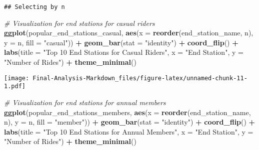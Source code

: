 \documentclass[
]{article}
\newenvironment{Shaded}{\begin{snugshade}}{\end{snugshade}}
\newcommand{\AttributeTok}[1]{\textcolor[rgb]{0.13,0.29,0.53}{#1}}
\newcommand{\CommentTok}[1]{\textcolor[rgb]{0.56,0.35,0.01}{\textit{#1}}}
\newcommand{\FunctionTok}[1]{\textcolor[rgb]{0.13,0.29,0.53}{\textbf{#1}}}
\newcommand{\NormalTok}[1]{#1}
\newcommand{\SpecialCharTok}[1]{\textcolor[rgb]{0.81,0.36,0.00}{\textbf{#1}}}
\newcommand{\StringTok}[1]{\textcolor[rgb]{0.31,0.60,0.02}{#1}}
\begin{document}
\begin{verbatim}
## Selecting by n
\end{verbatim}

\begin{Shaded}
\begin{Highlighting}[]
\CommentTok{\# Visualization for end stations for casual riders}
\FunctionTok{ggplot}\NormalTok{(popular\_end\_stations\_casual, }\FunctionTok{aes}\NormalTok{(}\AttributeTok{x =} \FunctionTok{reorder}\NormalTok{(end\_station\_name, n), }\AttributeTok{y =}\NormalTok{ n, }\AttributeTok{fill =} \StringTok{"casual"}\NormalTok{)) }\SpecialCharTok{+}
  \FunctionTok{geom\_bar}\NormalTok{(}\AttributeTok{stat =} \StringTok{"identity"}\NormalTok{) }\SpecialCharTok{+}
  \FunctionTok{coord\_flip}\NormalTok{() }\SpecialCharTok{+}
  \FunctionTok{labs}\NormalTok{(}\AttributeTok{title =} \StringTok{"Top 10 End Stations for Casual Riders"}\NormalTok{, }\AttributeTok{x =} \StringTok{"End Station"}\NormalTok{, }\AttributeTok{y =} \StringTok{"Number of Rides"}\NormalTok{) }\SpecialCharTok{+}
  \FunctionTok{theme\_minimal}\NormalTok{()}
\end{Highlighting}
\end{Shaded}

\texttt{[image: Final-Analysis-Markdown\_files/figure-latex/unnamed-chunk-11-1.pdf]}

\begin{Shaded}
\begin{Highlighting}[]
\CommentTok{\# Visualization for end stations for annual members}
\FunctionTok{ggplot}\NormalTok{(popular\_end\_stations\_members, }\FunctionTok{aes}\NormalTok{(}\AttributeTok{x =} \FunctionTok{reorder}\NormalTok{(end\_station\_name, n), }\AttributeTok{y =}\NormalTok{ n, }\AttributeTok{fill =} \StringTok{"member"}\NormalTok{)) }\SpecialCharTok{+}
  \FunctionTok{geom\_bar}\NormalTok{(}\AttributeTok{stat =} \StringTok{"identity"}\NormalTok{) }\SpecialCharTok{+}
  \FunctionTok{coord\_flip}\NormalTok{() }\SpecialCharTok{+}
  \FunctionTok{labs}\NormalTok{(}\AttributeTok{title =} \StringTok{"Top 10 End Stations for Annual Members"}\NormalTok{, }\AttributeTok{x =} \StringTok{"End Station"}\NormalTok{, }\AttributeTok{y =} \StringTok{"Number of Rides"}\NormalTok{) }\SpecialCharTok{+}
  \FunctionTok{theme\_minimal}\NormalTok{()}
\end{Highlighting}
\end{Shaded}
\end{document}
